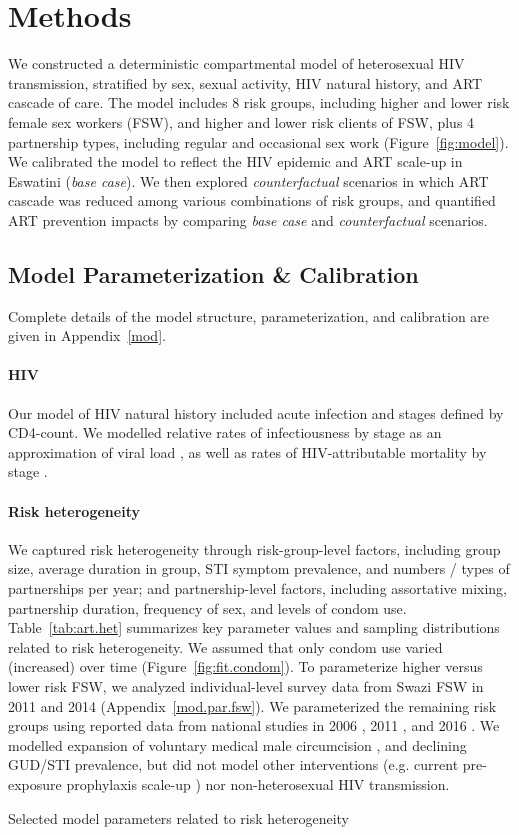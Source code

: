 \section{Methods}\label{art.meth}
We constructed a deterministic compartmental model of heterosexual HIV transmission,
stratified by sex, sexual activity, HIV natural history, and ART cascade of care.
The model includes 8 risk groups,
including higher and lower risk female sex workers (FSW), and higher and lower risk clients of FSW,
plus 4 partnership types, including regular and occasional sex work (Figure~\ref{fig:model}).
We calibrated the model to reflect the HIV epidemic and ART scale-up in Eswatini (\emph{base case}).
We then explored \emph{counterfactual} scenarios in which
ART cascade was reduced among various combinations of risk groups,
and quantified ART prevention impacts by comparing \emph{base case} and \emph{counterfactual} scenarios.
\subsection{Model Parameterization \& Calibration}\label{art.meth.par}
Complete details of the model structure, parameterization, and calibration are given in Appendix~\ref{mod}.
\paragraph{HIV}
Our model of HIV natural history included acute infection and stages defined by CD4-count.
We modelled relative rates of infectiousness by stage
as an approximation of viral load \cite{Wawer2005,Boily2009,Donnell2010},
as well as rates of HIV-attributable mortality by stage \cite{Badri2006,Anglaret2012,Mangal2017}.
\paragraph{Risk heterogeneity}
We captured risk heterogeneity through risk-group-level factors, including
group size, average duration in group, STI symptom prevalence, and numbers / types of partnerships per year;
and partnership-level factors, including
assortative mixing, partnership duration, frequency of sex, and levels of condom use.
Table~\ref{tab:art.het} summarizes key parameter values and sampling distributions related to risk heterogeneity.
We assumed that only condom use varied (increased) over time (Figure~\ref{fig:fit.condom}).
To parameterize higher versus lower risk FSW, we analyzed individual-level survey data
from Swazi FSW in 2011 \cite{Baral2014} and 2014 \cite{EswKP2014} (Appendix~\ref{mod.par.fsw}).
We parameterized the remaining risk groups using reported data from national studies in
2006 \cite{SDHS2006}, 2011 \cite{SHIMS1}, and 2016 \cite{SHIMS2}.
We modelled expansion of voluntary medical male circumcision \cite{SHIMS2},
and declining GUD/STI prevalence,
but did not model other interventions (e.g. current pre-exposure prophylaxis scale-up \cite{EswCOP21})
nor non-heterosexual HIV transmission.
\begin{table}
  \centering
  \caption{Selected model parameters related to risk heterogeneity}
  
  \label{tab:art.het}
\end{table}
